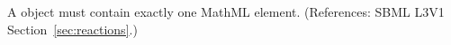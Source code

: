 A \KineticLaw object must contain exactly one MathML  element.
(References: SBML L3V1 Section~\ref{sec:reactions}.)
